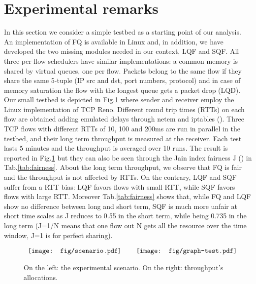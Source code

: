 \documentclass[a4paper,oneside, 11pt]{article}
\begin{document}
\section{Experimental remarks}\label{sec:exp-rem}
In this section we consider a simple testbed as a starting point of our analysis.
An implementation of FQ is available in Linux and, in addition, we have developed
the two missing modules needed in our context, LQF and SQF.
All three per-flow schedulers have similar implementations: a common memory is shared by virtual queues,
one per flow.
Packets belong to the same flow if they share the same
5-tuple (IP src and dst, port numbers, protocol) and in case of memory
saturation the flow with the longest queue gets a packet drop (LQD).
Our small testbed is depicted in Fig.\ref{fig:graph-test} where sender and receiver
employ the Linux implementation of TCP Reno. Different round trip times (RTTs) on each flow are obtained adding
emulated delays through netem and iptables (\hspace{-0.2mm}\cite{lartc}).
Three TCP flows with different RTTs  of 10, 100 and 200ms are run in parallel in the testbed,
and their long term throughput is measured at the receiver. Each test lasts 5 minutes and
the throughput is averaged over 10 runs. The result is reported in Fig.\ref{fig:graph-test}
but they can also be seen through the Jain index fairness J (\hspace{-0.2mm}\cite{jain})
in Tab.\ref{tab:fairness}.
About the long term throughput, we observe that
FQ is fair and the throughput is not affected by RTTs. On the contrary, LQF and SQF
suffer from a RTT bias: LQF favors flows with small RTT, while SQF favors flows with large RTT.
Moreover Tab.\ref{tab:fairness} shows that, while FQ and LQF show no difference between long and short term,
SQF is much more unfair at short time scales as J reduces to 0.55 in the short term, while being  0.735 in the long term
(J=1/N means that one flow out N gets all the resource over the
time window, J=1 is for perfect sharing).
\begin{figure}[htbp]
\centering
$\begin{array}{ccc}
\texttt{[image: fig/scenario.pdf]}\hspace{4mm}
&
\texttt{[image: fig/graph-test.pdf]}
\end{array}$
\caption{On the left: the experimental scenario. On the right: throughput's allocations.}
\label{fig:graph-test}
\end{figure}
\end{document}
